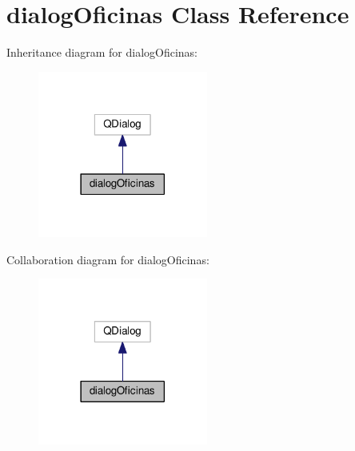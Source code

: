\hypertarget{classdialogOficinas}{}\section{dialog\+Oficinas Class Reference}
\label{classdialogOficinas}


Inheritance diagram for dialog\+Oficinas\+:
\nopagebreak
\begin{figure}[H]
\begin{center}
\leavevmode
\includegraphics[width=158pt]{classdialogOficinas__inherit__graph}
\end{center}
\end{figure}


Collaboration diagram for dialog\+Oficinas\+:
\nopagebreak
\begin{figure}[H]
\begin{center}
\leavevmode
\includegraphics[width=158pt]{classdialogOficinas__coll__graph}
\end{center}
\end{figure}
